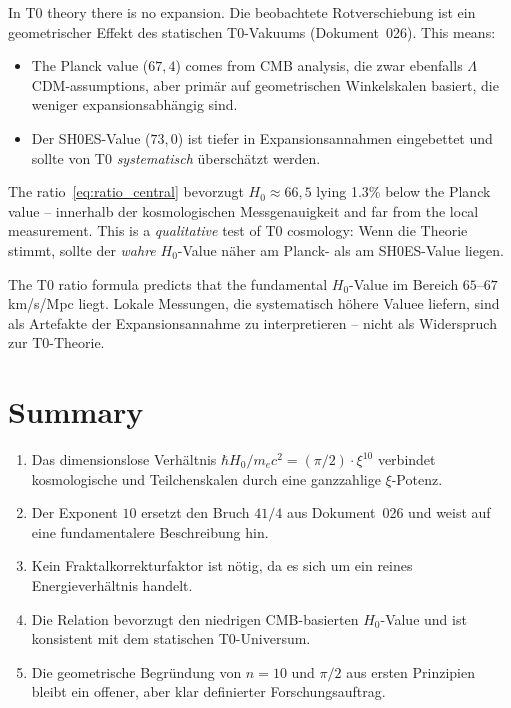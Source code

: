 In T0 theory there is no expansion. Die beobachtete
Rotverschiebung ist ein geometrischer Effekt des statischen
T0-Vakuums (Dokument~026). This means:

\begin{itemize}
    \item The Planck value ($67{,}4$) comes from CMB analysis, die
          zwar ebenfalls $\Lambda$CDM-assumptions, aber
          primär auf geometrischen Winkelskalen basiert, die
          weniger expansionsabhängig sind.
    \item Der SH0ES-Value ($73{,}0$) ist tiefer in
          Expansionsannahmen eingebettet und sollte von T0
          \emph{systematisch} überschätzt werden.
\end{itemize}

The ratio~\eqref{eq:ratio_central} bevorzugt $H_0 \approx 66{,}5$
lying 1.3\% below the Planck value -- innerhalb der
kosmologischen Messgenauigkeit and far from the local measurement.
This is a \emph{qualitative} test of T0 cosmology: Wenn die Theorie
stimmt, sollte der \emph{wahre} $H_0$-Value näher am Planck- als am
SH0ES-Value liegen.

\begin{keyresult}
    The T0 ratio formula predicts that the fundamental $H_0$-Value
    im Bereich $65$--$67$ km/s/Mpc liegt. Lokale Messungen, die
    systematisch höhere Valuee liefern, sind als Artefakte der
    Expansions\-annahme zu interpretieren -- nicht als
    Widerspruch zur T0-Theorie.
\end{keyresult}

\section{Summary}
\label{sec:summary}

\begin{foundation}
    \begin{enumerate}
        \item Das dimensionslose Verhältnis
              $\hbar H_0 / m_e c^2 = (\pi/2) \cdot \xi^{10}$ verbindet
              kosmologische und Teilchenskalen durch eine ganzzahlige
              $\xi$-Potenz.
        \item Der Exponent $10$ ersetzt den Bruch $41/4$ aus Dokument~026
              und weist auf eine fundamentalere Beschreibung hin.
        \item Kein Fraktal\-korrekturfaktor ist nötig, da es sich um ein
              reines Energieverhältnis handelt.
        \item Die Relation bevorzugt den niedrigen CMB-basierten
              $H_0$-Value und ist konsistent mit dem statischen
              T0-Universum.
        \item Die geometrische Begründung von $n = 10$ und $\pi/2$ aus
              ersten Prinzipien bleibt ein offener, aber
              klar definierter Forschungsauftrag.
    \end{enumerate}
\end{foundation}


